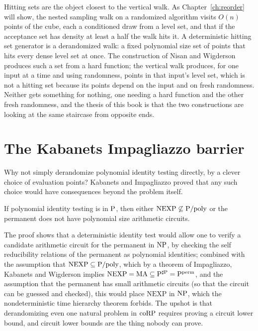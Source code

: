 Hitting sets are the object closest to the vertical walk. As Chapter~\ref{ch:reorder} will show, the nested sampling walk on a randomized algorithm visits $O(n)$ points of the cube, each a conditioned draw from a level set, and that if the acceptance set has density at least a half the walk hits it. A deterministic hitting set generator is a derandomized walk: a fixed polynomial size set of points that hits every dense level set at once. The construction of Nisan and Wigderson produces such a set from a hard function; the vertical walk produces, for one input at a time and using randomness, points in that input's level set, which is not a hitting set because its points depend on the input and on fresh randomness. Neither gets something for nothing, one needing a hard function and the other fresh randomness, and the thesis of this book is that the two constructions are looking at the same staircase from opposite ends.

\section{The Kabanets Impagliazzo barrier}

Why not simply derandomize polynomial identity testing directly, by a clever choice of evaluation points? Kabanets and Impagliazzo proved that any such choice would have consequences beyond the problem itself.

\begin{theorem}
If polynomial identity testing is in $\mathrm{P}$, then either $\mathrm{NEXP} \not\subseteq \mathrm{P}/\mathrm{poly}$ or the permanent does not have polynomial size arithmetic circuits.
\end{theorem}

The proof shows that a deterministic identity test would allow one to verify a candidate arithmetic circuit for the permanent in $\mathrm{NP}$, by checking the self reducibility relations of the permanent as polynomial identities; combined with the assumption that $\mathrm{NEXP} \subseteq \mathrm{P}/\mathrm{poly}$, which by a theorem of Impagliazzo, Kabanets and Wigderson implies $\mathrm{NEXP} = \mathrm{MA} \subseteq \mathrm{P}^{\sharp\mathrm{P}} = \mathrm{P}^{\mathrm{perm}}$, and the assumption that the permanent has small arithmetic circuits (so that the circuit can be guessed and checked), this would place $\mathrm{NEXP}$ in $\mathrm{NP}$, which the nondeterministic time hierarchy theorem forbids. The upshot is that derandomizing even one natural problem in $\mathrm{coRP}$ requires proving a circuit lower bound, and circuit lower bounds are the thing nobody can prove.

